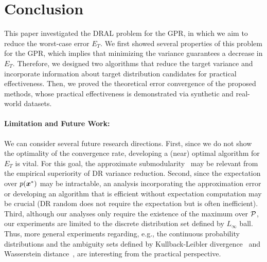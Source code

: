 \section{Conclusion}
\label{sec:conclusion}

This paper investigated the DRAL problem for the GPR, in which we aim to reduce the worst-case error $E_T$.
%
We first showed several properties of this problem for the GPR, which implies that minimizing the variance guarantees a decrease in $E_T$. 
%
Therefore, we designed two algorithms that reduce the target variance and incorporate information about target distribution candidates for practical effectiveness.
%
Then, we proved the theoretical error convergence of the proposed methods, whose practical effectiveness is demonstrated via synthetic and real-world datasets.



\paragraph{Limitation and Future Work:}
We can consider several future research directions.
%
First, since we do not show the optimality of the convergence rate, developing a (near) optimal algorithm for $E_T$ is vital.
%
For this goal, the approximate submodularity~\citep{bian2017guarantees} may be relevant from the empirical superiority of DR variance reduction.
%
Second, since the expectation over $p(\boldsymbol{x}^*)$ may be intractable, an analysis incorporating the approximation error or developing an algorithm that is efficient without expectation computation may be crucial (DR random does not require the expectation but is often inefficient).
%
Third, although our analyses only require the existence of the maximum over ${\cal P}$, our experiments are limited to the discrete distribution set defined by $L_{\infty}$ ball.
%
Thus, more general experiments regarding, e.g., the continuous probability distributions and the ambiguity sets defined by Kullback-Leibler divergence~\citep{hu2013kullback} and Wasserstein distance~\citep{frogner2021incorporating}, are interesting from the practical perspective.


